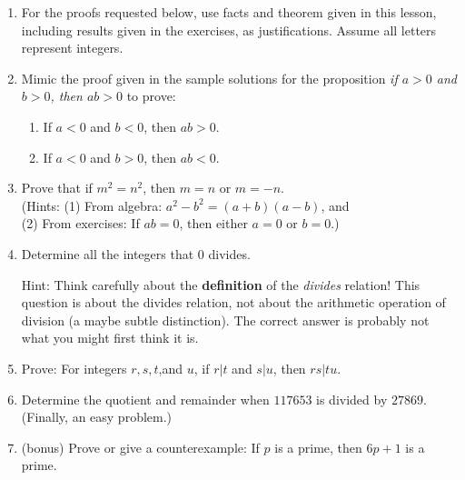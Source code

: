 \documentclass[11pt]{amsart}
\begin{document}
\begin{enumerate}

\item[]
{\small For the proofs requested below, use facts and theorem 
given in this lesson, including results given in the exercises,  as justifications. Assume all letters represent
integers.}\\[5pt]

\item  Mimic the proof given in the sample solutions for the proposition
 {\it if $a>0$ and $b>0$, then $ab>0$} to prove:\\[3pt]
 
\begin{enumerate}
\item If $a<0$ and $b<0$, then $ab>0$.\\[3pt]
\item If $a<0$ and $b>0$, then $ab<0$.\\[5pt]
\end{enumerate}


\item 
Prove that if $m^{2} = n^{2}$, then $m=n$ or $m = -n$.\\
 (Hints: (1) From algebra: $a^{2}-b^{2} = (a+b)(a-b)$, and \\
 (2) From exercises: If $ab=0$, then either $a=0$ or $b=0$.) \\[5pt]

\item  Determine all the integers that $0$ divides.

Hint: Think carefully about the {\bf definition} of the {\it divides} relation! This question is about the divides relation, not about the arithmetic operation of division (a maybe subtle distinction). The correct answer is probably not what you might first think it is.\\[5pt]


\item Prove: For integers $r,s,t$,and $u$, if $r|t$ and $s|u$, then $rs|tu$.\\[5pt]

\item Determine the quotient and remainder when $117653$ is
divided by $27869$. (Finally, an easy problem.)\\[5pt]

\item (bonus) Prove or give a counterexample: If $p$ is a prime, then $6p+1$ is a prime.\\[5pt]
\end{enumerate}
\end{document}
